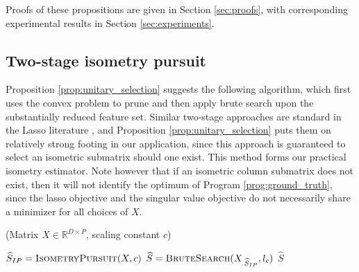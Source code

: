 Proofs of these propositions are given in Section \ref{sec:proofs}, with corresponding experimental results in Section \ref{sec:experiments}.

\subsection{Two-stage isometry pursuit}

Proposition \ref{prop:unitary_selection} suggests the following algorithm, which first uses the convex problem to prune and then apply brute search upon the substantially reduced feature set.
Similar two-stage approaches are standard in the Lasso literature \cite{Hesterberg2008-iy, Koelle2022-ju}, and Proposition \ref{prop:unitary_selection} puts them on relatively strong footing in our application, since this approach is guaranteed to select an isometric submatrix should one exist.
This method forms our practical isometry estimator.
Note however that if an isometric column submatrix does not exist, then it will not identify the optimum of Program \ref{prog:ground_truth}, since the lasso objective and the singular value objective do not necessarily share a minimizer for all choices of $X$.

\begin{algorithm}[H]
\caption{\tsip(Matrix ${X} \in \mathbb{R}^{D \times P}$, scaling constant $c$)}
\begin{algorithmic}[1]
\STATE $\widehat{S}_{IP} = \text{{\sc IsometryPursuit}}( X, c)$
\STATE $\widehat{S} = \text {{\sc BruteSearch}}({X}_{.\widehat{S}_{IP}}, l_c)$
 $\widehat{S}$
\end{algorithmic}
\end{algorithm}

